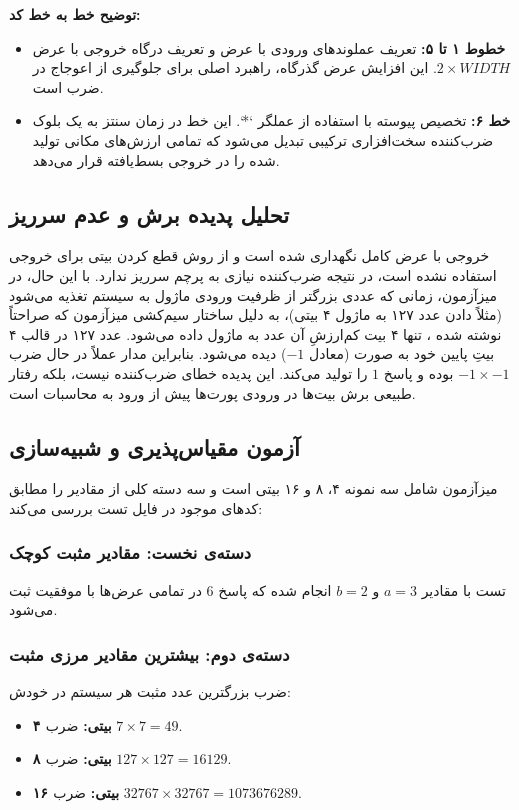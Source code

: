 \documentclass[11pt,a4paper]{article}
\begin{document}
\textbf{توضیح خط به خط کد:}
\begin{itemize}
    \item \textbf{خطوط ۱ تا ۵:} تعریف عملوندهای ورودی با عرض  و تعریف درگاه خروجی با عرض $2 \times WIDTH$. این افزایش عرض گذرگاه، راهبرد اصلی برای جلوگیری از اعوجاج در ضرب است.
    \item \textbf{خط ۶:} تخصیص پیوسته با استفاده از عملگر `*`. این خط در زمان سنتز به یک بلوک ضرب‌کننده سخت‌افزاری ترکیبی تبدیل می‌شود که تمامی ارزش‌های مکانی تولید شده را در خروجی بسط‌یافته قرار می‌دهد.
\end{itemize}

\subsection{تحلیل پدیده برش و عدم سرریز}
خروجی با عرض کامل نگهداری شده است و از روش قطع کردن بیتی برای خروجی استفاده نشده است، در نتیجه ضرب‌کننده نیازی به پرچم سرریز ندارد.
با این حال، در میزآزمون، زمانی که عددی بزرگتر از ظرفیت ورودی ماژول به سیستم تغذیه می‌شود (مثلاً دادن عدد ۱۲۷ به ماژول ۴ بیتی)، به دلیل ساختار سیم‌کشی میزآزمون که صراحتاً نوشته شده ، تنها ۴ بیت کم‌ارزشِ آن عدد به ماژول داده می‌شود. عدد ۱۲۷ در قالب ۴ بیتِ پایین خود به صورت  (معادل $-1$) دیده می‌شود. بنابراین مدار عملاً در حال ضرب $-1 \times -1$ بوده و پاسخ $1$ را تولید می‌کند. این پدیده خطای ضرب‌کننده نیست، بلکه رفتار طبیعی برش بیت‌ها در ورودی پورت‌ها پیش از ورود به محاسبات است.

\subsection{آزمون مقیاس‌پذیری و شبیه‌سازی}
میزآزمون شامل سه نمونه ۴، ۸ و ۱۶ بیتی است و سه دسته کلی از مقادیر را مطابق کدهای موجود در فایل تست بررسی می‌کند:

\subsubsection{دسته‌ی نخست: مقادیر مثبت کوچک}
تست با مقادیر $a = 3$ و $b = 2$ انجام شده که پاسخ $6$ در تمامی عرض‌ها با موفقیت ثبت می‌شود.

\subsubsection{دسته‌ی دوم: بیشترین مقادیر مرزی مثبت}
ضرب بزرگترین عدد مثبت هر سیستم در خودش:
\begin{itemize}
    \item \textbf{۴ بیتی:} ضرب $7 \times 7 = 49$.
    \item \textbf{۸ بیتی:} ضرب $127 \times 127 = 16129$.
    \item \textbf{۱۶ بیتی:} ضرب $32767 \times 32767 = 1073676289$.
\end{itemize}
\end{document}
